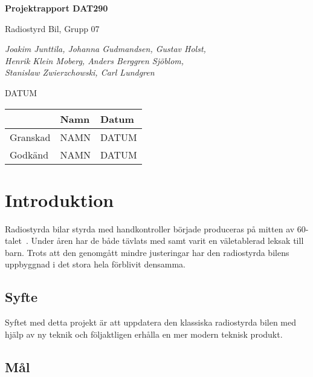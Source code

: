 \documentclass[a4paper]{article}
\begin{document}
\begin{titlepage}
\centering
{\bfseries\huge Projektrapport DAT290}

\vspace{10mm}

{\Large Radiostyrd Bil, Grupp 07}

\vspace{20mm}

{\Large \itshape{Joakim Junttila, Johanna Gudmandsen, Gustav Holst,\\Henrik Klein Moberg, Anders Berggren Sjöblom, \\[1mm] Stanislaw Zwierzchowski, Carl Lundgren}}

\vspace{10mm}

{DATUM}


\normalsize{
\begin{table}[b]
\centering
\begin{tabular}{|l|l|l|}  \hline
          & \bf Namn & \bf Datum   \\ \hline \hline
 Granskad & NAMN     & DATUM        \\ \hline
 Godkänd  & NAMN     & DATUM         \\ \hline
  \end{tabular}  
  \end{table}}
\end{titlepage}

\tableofcontents


\newpage
\section{Introduktion}

Radiostyrda bilar styrda med handkontroller började produceras på mitten av 60-talet~\cite{RCHistory}. Under åren har de både tävlats med samt varit en väletablerad leksak till barn. Trots att den genomgått mindre justeringar har den radiostyrda bilens uppbyggnad i det stora hela förblivit densamma.

\subsection{Syfte}

Syftet med detta projekt är att uppdatera den klassiska radiostyrda bilen med hjälp av ny teknik och följaktligen erhålla en mer modern teknisk produkt.

\subsection{Mål}
\end{document}
